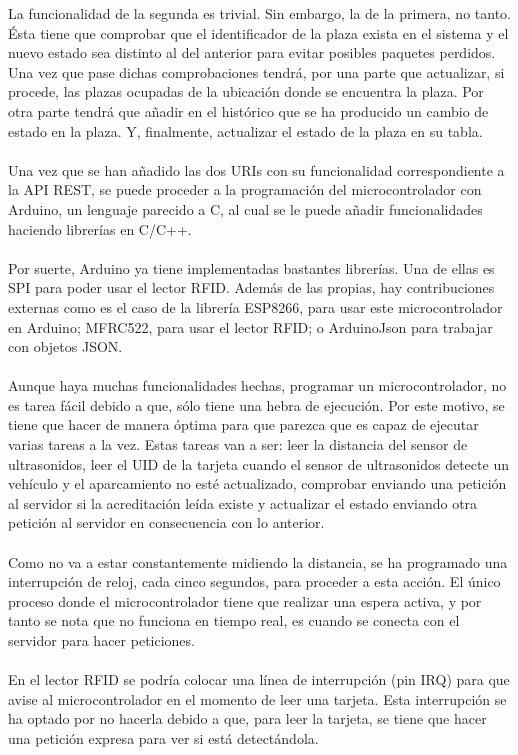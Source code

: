 La funcionalidad de la segunda es trivial. Sin embargo, la de la primera, no tanto. Ésta tiene que comprobar que el identificador de la plaza exista en el sistema y el nuevo estado sea distinto al del anterior para evitar posibles paquetes perdidos. Una vez que pase dichas comprobaciones tendrá, por una parte que actualizar, si procede, las plazas ocupadas de la ubicación donde se encuentra la plaza. Por otra parte tendrá que añadir en el histórico que se ha producido un cambio de estado en la plaza. Y, finalmente, actualizar el estado de la plaza en su tabla.
\\\\
\newpage
Una vez que se han añadido las dos URIs con su funcionalidad correspondiente a la API REST, se puede proceder a la programación del microcontrolador con Arduino, un lenguaje parecido a C, al cual se le puede añadir funcionalidades haciendo librerías en C/C++.
\\\\
Por suerte, Arduino ya tiene implementadas bastantes librerías. Una de ellas es SPI para poder usar el lector RFID. Además de las propias, hay contribuciones externas como es el caso de la librería ESP8266, para usar este microcontrolador en Arduino; MFRC522, para usar el lector RFID; o ArduinoJson para trabajar con objetos JSON.
\\\\
Aunque haya muchas funcionalidades hechas, programar un microcontrolador, no es tarea fácil debido a que, sólo tiene una hebra de ejecución. Por este motivo, se tiene que hacer de manera óptima para que parezca que es capaz de ejecutar varias tareas a la vez. Estas tareas van a ser: leer la distancia del sensor de ultrasonidos, leer el UID de la tarjeta cuando el sensor de ultrasonidos detecte un vehículo y el aparcamiento no esté actualizado, comprobar enviando una petición al servidor si la acreditación leída existe y actualizar el estado enviando otra petición al servidor en consecuencia con lo anterior.
\\\\
Como no va a estar constantemente midiendo la distancia, se ha programado una interrupción de reloj, cada cinco segundos, para proceder a esta acción. El único proceso donde el microcontrolador tiene que realizar una espera activa, y por tanto se nota que no funciona en tiempo real, es cuando se conecta con el servidor para hacer peticiones.
\\\\
En el lector RFID se podría colocar una línea de interrupción (pin IRQ) para que avise al microcontrolador en el momento de leer una tarjeta. Esta interrupción se ha optado por no hacerla debido a que, para leer la tarjeta, se tiene que hacer una petición expresa para ver si está detectándola.

